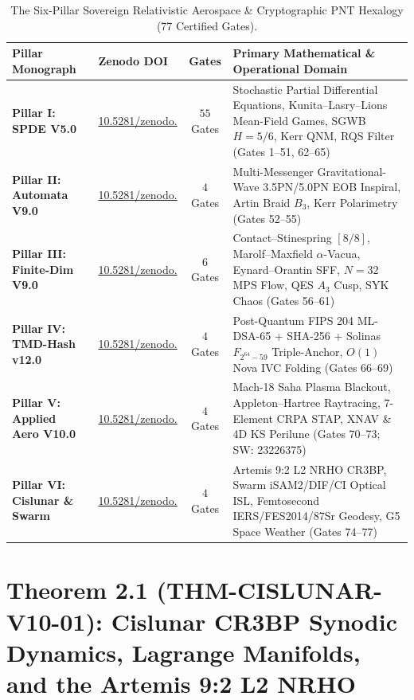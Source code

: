 \documentclass[11pt,a4paper,reqno]{article}
\def\texttt#1{#1}%
\def\mathcal#1{#1}%
\def\mathbb#1{#1}%
\newcommand{\zenodo}[1]{\href{https://doi.org/10.5281/zenodo.#1}{\texttt{10.5281/\allowbreak zenodo.\allowbreak #1}}}
\theoremstyle{plain}
\theoremstyle{definition}
\theoremstyle{remark}
\numberwithin{equation}{section}
\renewcommand{\arraystretch}{1.08}
\begin{document}
\begin{table}[H]
\centering
\caption{The Six-Pillar Sovereign Relativistic Aerospace \& Cryptographic PNT Hexalogy (77 Certified Gates).}
\label{tab:hexalogy_overview}
\footnotesize
\setlength{\tabcolsep}{4pt}
\renewcommand{\arraystretch}{1.22}
\begin{tabularx}{\textwidth}{l l c X}
\toprule
\textbf{Pillar Monograph} & \textbf{Zenodo DOI} & \textbf{Gates} & \textbf{Primary Mathematical \& Operational Domain} \\
\midrule
\textbf{Pillar I: SPDE V5.0} & \zenodo{23216274} & $55$ Gates & Stochastic Partial Differential Equations, Kunita--Lasry--Lions Mean-Field Games, SGWB $H=5/6$, Kerr QNM, RQS Filter (\texttt{Gates 1--51, 62--65}) \\
\textbf{Pillar II: Automata V9.0} & \zenodo{23210362} & $4$ Gates & Multi-Messenger Gravitational-Wave 3.5PN/5.0PN EOB Inspiral, Artin Braid $\mathcal{B}_3$, Kerr Polarimetry (\texttt{Gates 52--55}) \\
\textbf{Pillar III: Finite-Dim V9.0} & \zenodo{23211885} & $6$ Gates & Contact--Stinespring $[8/8]$, Marolf--Maxfield $\alpha$-Vacua, Eynard--Orantin SFF, $N=32$ MPS Flow, QES $A_3$ Cusp, SYK Chaos (\texttt{Gates 56--61}) \\
\textbf{Pillar IV: TMD-Hash v12.0} & \zenodo{23218553} & $4$ Gates & Post-Quantum FIPS 204 ML-DSA-65 + SHA-256 + Solinas $\mathbb{F}_{2^{64}-59}$ Triple-Anchor, $\mathcal{O}(1)$ Nova IVC Folding (\texttt{Gates 66--69}) \\
\textbf{Pillar V: Applied Aero V10.0} & \zenodo{23226184} & $4$ Gates & Mach-18 Saha Plasma Blackout, Appleton--Hartree Raytracing, 7-Element CRPA STAP, XNAV \& 4D KS Perilune (\texttt{Gates 70--73}; SW: \texttt{23226375}) \\
\textbf{Pillar VI: Cislunar \& Swarm} & \zenodo{23227003} & $4$ Gates & Artemis 9:2 L2 NRHO CR3BP, Swarm iSAM2/DIF/CI Optical ISL, Femtosecond IERS/FES2014/87Sr Geodesy, G5 Space Weather (\texttt{Gates 74--77}) \\
\bottomrule
\end{tabularx}
\end{table}

\section{\texorpdfstring{Theorem 2.1 (\texttt{THM-CISLUNAR-V10-01}): Cislunar CR3BP Synodic Dynamics, Lagrange Manifolds, and the Artemis 9:2 L2 NRHO}{Theorem 2.1 (THM-CISLUNAR-V10-01): Cislunar CR3BP Synodic Dynamics, Lagrange Manifolds, and the Artemis 9:2 L2 NRHO}}
\end{document}
